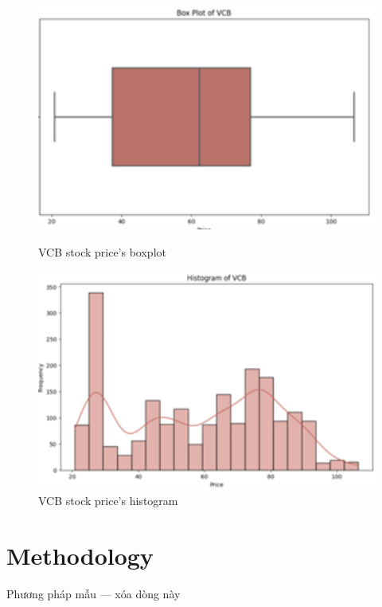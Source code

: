 \documentclass{ieeeojies}
\begin{document}
\begin{figure}[H]
    \centering
    \begin{minipage}{0.23\textwidth}
    \centering
    \includegraphics[width=1\textwidth]{bibliography/Figure/VCBboxplot.png}
    \caption{VCB stock price's boxplot}
    \label{fig:1}
    \end{minipage}
    \hfill
    \begin{minipage}{0.23\textwidth}
    \centering
    \includegraphics[width=1\textwidth]{bibliography/Figure/VCBhist.png}
    \caption{VCB stock price's histogram}
    \label{fig:2}
    \end{minipage}
\end{figure}

\section{Methodology}
Phương pháp mẫu --- xóa dòng này 
\end{document}
